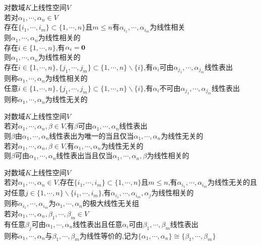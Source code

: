 \begin{dingli}
对数域$K$上线性空间$V$\\
若对$\alpha_1,\cdots,\alpha_n\in V$\\
存在$\{i_1,\cdots,i_m\}\subset\{1,\cdots,n\}$且$m\leq n$有$\alpha_{i_1},\cdots,\alpha_{i_m}$为线性相关\\
则$\alpha_1,\cdots,\alpha_n$为线性相关的\\
存在$i\in\{1,\cdots,n\}$,有$\alpha_i={\bf0}$\\
则$\alpha_1,\cdots,\alpha_n$为线性相关的\\
存在$i\in\{1,\cdots,n\},\{j_1,\cdots,j_m\}\subset\{1,\cdots,n\}\backslash\{i\}$,有$\alpha_i$可由$\alpha_{j_1},\cdots,\alpha_{j_m}$线性表出\\
则称$\alpha_1,\cdots,\alpha_n$为线性相关的\\
任意$i\in\{1,\cdots,n\},\{j_1,\cdots,j_m\}\subset\{1,\cdots,n\}\backslash\{i\}$,有$\alpha_i$不可由$\alpha_{j_1},\cdots,\alpha_{j_m}$线性表出\\
则称$\alpha_1,\cdots,\alpha_n$为线性无关的
\end{dingli}

\begin{dingli}
对数域$K$上线性空间$V$\\
若对$\alpha_1,\cdots,\alpha_n,\beta\in V$,有$\beta$可由$\alpha_1,\cdots,\alpha_n$线性表出\\
则$\beta$由$\alpha_1,\cdots,\alpha_n$线性表出为唯一的当且仅当$\alpha_1,\cdots,\alpha_n$为线性无关的\\
若对$\alpha_1,\cdots,\alpha_n,\beta\in V$,有$\alpha_1,\cdots,\alpha_n$为线性无关的\\
则$\beta$可由$\alpha_1,\cdots,\alpha_n$线性表出当且仅当$\alpha_1,\cdots,\alpha_n,\beta$为线性相关的
\end{dingli}

\begin{dingyi}
对数域$K$上线性空间$V$\\
若对$\alpha_1,\cdots,\alpha_n\in V$,存在$\{i_1,\cdots,i_m\}\subset\{1,\cdots,n\}$且$m\leq n$,有$\alpha_{i_1},\cdots,\alpha_{i_m}$为线性无关的且对任意$j\in\{1,\cdots,n\}\backslash\{i_1,\cdots,i_m\}$,有$\alpha_{i_1},\cdots,\alpha_{i_m},\alpha_j$为线性相关的\\
则称$\alpha_{i_1},\cdots,\alpha_{i_m}$为$\alpha_1,\cdots,\alpha_n$的极大线性无关组\\
若对$\alpha_1,\cdots,\alpha_n,\beta_1,\cdots,\beta_m\in V$\\
有任意$\beta_j$可由$\alpha_1,\cdots,\alpha_n$线性表出且任意$\alpha_i$可由$\beta_1,\cdots,\beta_m$线性表出\\
则称$\alpha_1,\cdots,\alpha_n$与$\beta_1,\cdots,\beta_m$为线性等价的,记为$\{\alpha_1,\cdots,\alpha_n\}\cong\{\beta_1,\cdots,\beta_m\}$
\end{dingyi}

